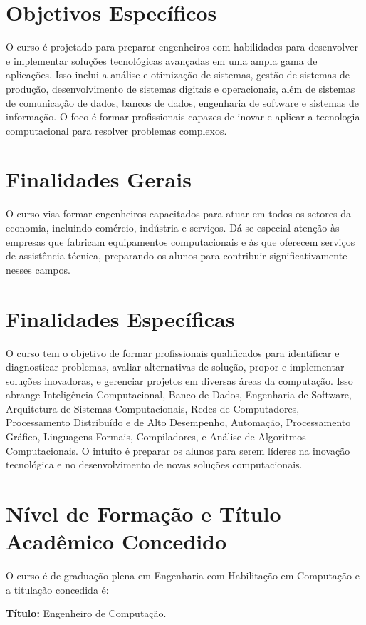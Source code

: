 \section{Objetivos Específicos}
O curso é projetado para preparar engenheiros com habilidades para desenvolver e implementar soluções tecnológicas avançadas em uma ampla gama de aplicações. Isso inclui a análise e otimização de sistemas, gestão de sistemas de produção, desenvolvimento de sistemas digitais e operacionais, além de sistemas de comunicação de dados, bancos de dados, engenharia de software e sistemas de informação. O foco é formar profissionais capazes de inovar e aplicar a tecnologia computacional para resolver problemas complexos.

\section{Finalidades Gerais}
O curso visa formar engenheiros capacitados para atuar em todos os setores da economia, incluindo comércio, indústria e serviços. Dá-se especial atenção às empresas que fabricam equipamentos computacionais e às que oferecem serviços de assistência técnica, preparando os alunos para contribuir significativamente nesses campos.

\section{Finalidades Específicas}
O curso tem o objetivo de formar profissionais qualificados para identificar e diagnosticar problemas, avaliar alternativas de solução, propor e implementar soluções inovadoras, e gerenciar projetos em diversas áreas da computação. Isso abrange Inteligência Computacional, Banco de Dados, Engenharia de Software, Arquitetura de Sistemas Computacionais, Redes de Computadores, Processamento Distribuído e de Alto Desempenho, Automação, Processamento Gráfico, Linguagens Formais, Compiladores, e Análise de Algoritmos Computacionais. O intuito é preparar os alunos para serem líderes na inovação tecnológica e no desenvolvimento de novas soluções computacionais.

\section{Nível de Formação e Título Acadêmico Concedido}
O curso é de graduação plena em Engenharia com Habilitação em Computação e a titulação concedida é:

\textbf{Título:} Engenheiro de Computação.

